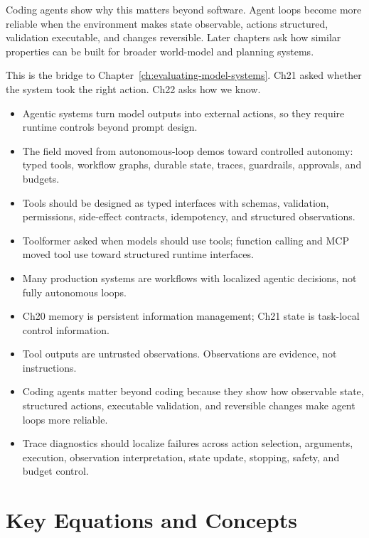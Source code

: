 Coding agents show why this matters beyond software. Agent loops become more reliable when the environment makes state observable, actions structured, validation executable, and changes reversible. Later chapters ask how similar properties can be built for broader world-model and planning systems.

This is the bridge to Chapter~\ref{ch:evaluating-model-systems}. Ch21 asked whether the system took the right action. Ch22 asks how we know.

\begin{takeaways}
\begin{itemize}
  \item Agentic systems turn model outputs into external actions, so they require runtime controls beyond prompt design.
  \item The field moved from autonomous-loop demos toward controlled autonomy: typed tools, workflow graphs, durable state, traces, guardrails, approvals, and budgets.
  \item Tools should be designed as typed interfaces with schemas, validation, permissions, side-effect contracts, idempotency, and structured observations.
  \item Toolformer asked when models should use tools; function calling and MCP moved tool use toward structured runtime interfaces.
  \item Many production systems are workflows with localized agentic decisions, not fully autonomous loops.
  \item Ch20 memory is persistent information management; Ch21 state is task-local control information.
  \item Tool outputs are untrusted observations. Observations are evidence, not instructions.
  \item Coding agents matter beyond coding because they show how observable state, structured actions, executable validation, and reversible changes make agent loops more reliable.
  \item Trace diagnostics should localize failures across action selection, arguments, execution, observation interpretation, state update, stopping, safety, and budget control.
\end{itemize}
\end{takeaways}

\section*{Key Equations and Concepts}

